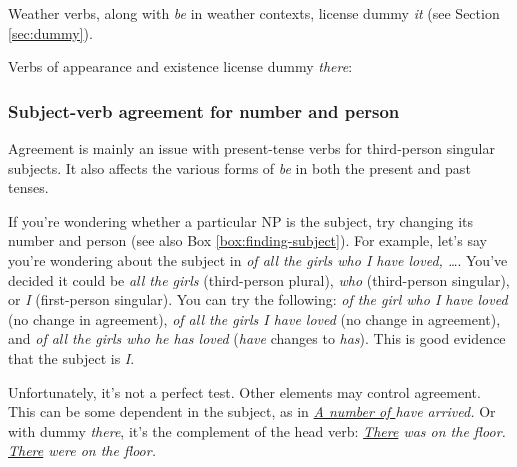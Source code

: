 Weather verbs, along with {\textit{be}} in weather contexts, license dummy \textit{it} (see Section \ref{sec:dummy}). 

\ea
    \z
\z

Verbs of appearance and existence license dummy \textit{there}: 

\ea
    \z
\z

\subsubsection*{Subject-verb agreement for number and person}
Agreement is mainly an issue with present-tense verbs for third-person singular subjects. It also affects the various forms of \textit{be} in both the present and past tenses. 

\ea
    \z
\z

If you're wondering whether a particular NP is the subject, try changing its number and person (see also Box \ref{box:finding-subject}). For example, let's say you're wondering about the subject in \textit{of all the girls who I have loved, \dots}. You've decided it could be \textit{all the girls} (third-person plural), \textit{who} (third-person singular), or \textit{I} (first-person singular). You can try the following: \textit{of the girl who I have loved} (no change in agreement), \textit{of all the girls I have loved} (no change in agreement), and \textit{of all the girls who he has loved} (\textit{have} changes to \textit{has}). This is good evidence that the subject is \textit{I}.

Unfortunately, it's not a perfect test. Other elements may control agreement. This can be some dependent in the subject, as in \textit{\uline{A number of } have arrived.} Or with dummy \textit{there}, it's the complement of the head verb: \textit{\uline{There} was  on the floor.} \textit{\uline{There} were  on the floor.}

